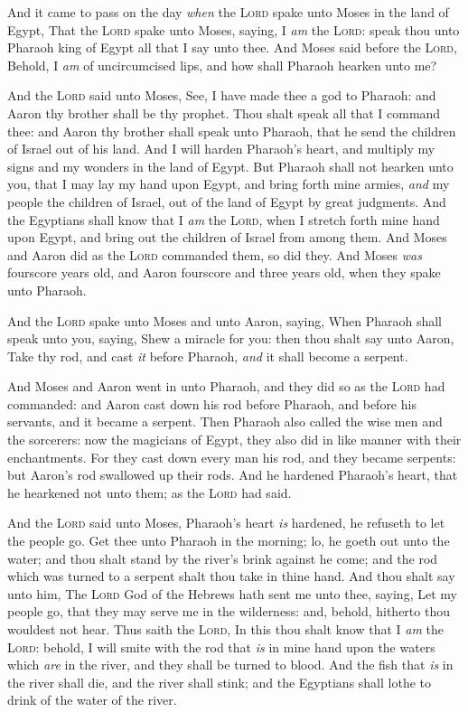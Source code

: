 \documentclass[11pt,letterpaper,oneside]{memoir}
\begin{document}
And it came to pass on the day \emph{when} the \textsc{Lord} spake unto
Moses in the land of Egypt, That the \textsc{Lord} spake unto Moses,
saying, I \emph{am} the \textsc{Lord}: speak thou unto Pharaoh king of
Egypt all that I say unto thee. And Moses said before the \textsc{Lord},
Behold, I \emph{am} of uncircumcised lips, and how shall Pharaoh hearken
unto me?

And the \textsc{Lord} said unto Moses, See, I have made thee a god to
Pharaoh: and Aaron thy brother shall be thy prophet. Thou shalt speak
all that I command thee: and Aaron thy brother shall speak unto Pharaoh,
that he send the children of Israel out of his land. And I will harden
Pharaoh's heart, and multiply my signs and my wonders in the land of
Egypt. But Pharaoh shall not hearken unto you, that I may lay my hand
upon Egypt, and bring forth mine armies, \emph{and} my people the
children of Israel, out of the land of Egypt by great judgments. And the
Egyptians shall know that I \emph{am} the \textsc{Lord}, when I stretch
forth mine hand upon Egypt, and bring out the children of Israel from
among them. And Moses and Aaron did as the \textsc{Lord} commanded them,
so did they. And Moses \emph{was} fourscore years old, and Aaron
fourscore and three years old, when they spake unto Pharaoh.

And the \textsc{Lord} spake unto Moses and unto Aaron, saying, When
Pharaoh shall speak unto you, saying, Shew a miracle for you: then thou
shalt say unto Aaron, Take thy rod, and cast \emph{it} before Pharaoh,
\emph{and} it shall become a serpent.

And Moses and Aaron went in unto Pharaoh, and they did so as the
\textsc{Lord} had commanded: and Aaron cast down his rod before Pharaoh,
and before his servants, and it became a serpent. Then Pharaoh also
called the wise men and the sorcerers: now the magicians of Egypt, they
also did in like manner with their enchantments. For they cast down
every man his rod, and they became serpents: but Aaron's rod swallowed
up their rods. And he hardened Pharaoh's heart, that he hearkened not
unto them; as the \textsc{Lord} had said.

And the \textsc{Lord} said unto Moses, Pharaoh's heart \emph{is}
hardened, he refuseth to let the people go. Get thee unto Pharaoh in the
morning; lo, he goeth out unto the water; and thou shalt stand by the
river's brink against he come; and the rod which was turned to a serpent
shalt thou take in thine hand. And thou shalt say unto him, The
\textsc{Lord} God of the Hebrews hath sent me unto thee, saying, Let my
people go, that they may serve me in the wilderness: and, behold,
hitherto thou wouldest not hear. Thus saith the \textsc{Lord}, In this
thou shalt know that I \emph{am} the \textsc{Lord}: behold, I will smite
with the rod that \emph{is} in mine hand upon the waters which
\emph{are} in the river, and they shall be turned to blood. And the fish
that \emph{is} in the river shall die, and the river shall stink; and
the Egyptians shall lothe to drink of the water of the river.
\end{document}
